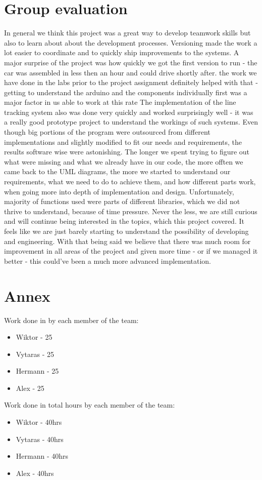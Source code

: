 \documentclass[conference]{IEEEtran}
\begin{document}
\section{Group evaluation}
In general we think this project was a great way to develop teamwork skills but also to learn about about the development processes. Versioning made the work a lot easier to coordinate and to quickly ship improvements to the systems. A major surprise of the project was how quickly we got the first version to run - the car was assembled in less then an hour and could drive shortly after. the work we have done in the labs prior to the project assignment definitely helped with that - getting to understand the arduino and the components individually first was a major factor in us able to work at this rate The implementation of the line tracking system also was done very quickly and worked surprisingly well - it was a really good prototype project to understand the workings of such systems. Even though big portions of the program were outsourced from different implementations and slightly modified to fit our needs and requirements, the results software wise were astonishing. The longer we spent trying to figure out what were missing and what we already have in our code, the more offten we came back to the UML diagrams, the more we started to understand our requirements, what we need to do to achieve them, and how different parts work, when going more into depth of implementation and design. Unfortunately, majority of functions used were parts of different libraries, which we did not thrive to understand, because of time pressure. Never the less, we are still curious and will continue being interested in the topics, which this project covered. It feels like we are just barely starting to understand the possibility of developing and engineering. With that being said we believe that there was much room for improvement in all areas of the project and given more time - or if we managed it better - this could've been a much more advanced implementation.

\section{Annex}

Work done in \text{\%} by each member of the team:
\begin{itemize}
\item Wiktor - 25\text{\%}
\item Vytaras - 25\text{\%}
\item Hermann - 25\text{\%}
\item Alex - 25\text{\%}
\end{itemize}
Work done in total hours by each member of the team:
\begin{itemize}
\item Wiktor - 40hrs
\item Vytaras - 40hrs
\item Hermann - 40hrs
\item Alex - 40hrs
\end{itemize}
\end{document}
